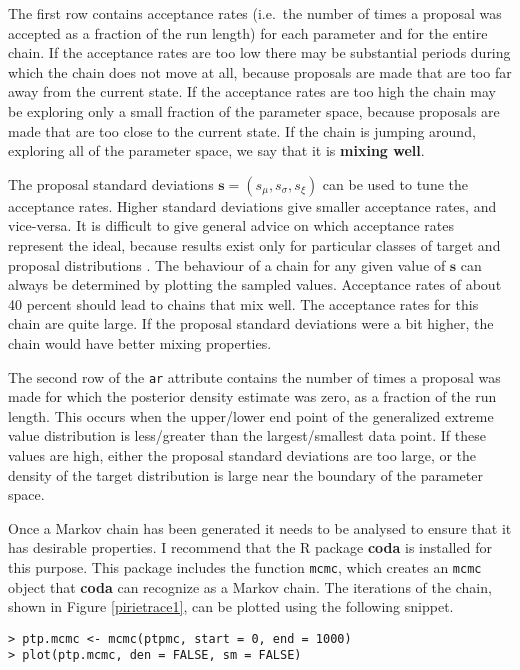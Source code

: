 \documentclass[11pt,a4paper]{article}
\newcommand{\bs}{\boldsymbol}
\begin{document}
The first row contains acceptance rates (i.e.\ the number of times a
proposal was accepted as a fraction of the run length) for each
parameter and for the entire chain.  If the acceptance rates are too
low there may be substantial periods during which the chain does not
move at all, because proposals are made that are too far away from the
current state.  If the acceptance rates are too high the chain may be
exploring only a small fraction of the parameter space, because
proposals are made that are too close to the current state.  If the
chain is jumping around, exploring all of the parameter space, we say
that it is \textbf{mixing well}.

The proposal standard deviations $\bs{s} = (s_\mu,s_\sigma,s_\xi)$ can
be used to tune the acceptance rates.  Higher standard deviations give
smaller acceptance rates, and vice-versa.  It is difficult to give
general advice on which acceptance rates represent the ideal, because
results exist only for particular classes of target and proposal
distributions \citep[e.g.][]{gelmcarl95}.  The behaviour of a chain
for any given value of $\bs{s}$ can always be determined by plotting
the sampled values.  Acceptance rates of about 40 percent should lead
to chains that mix well.  The acceptance rates for this chain are
quite large.  If the proposal standard deviations were a bit higher,
the chain would have better mixing properties.

The second row of the \verb+ar+ attribute contains the number of times
a proposal was made for which the posterior density estimate was zero,
as a fraction of the run length.  This occurs when the upper/lower end
point of the generalized extreme value distribution is less/greater
than the largest/smallest data point.  If these values are high,
either the proposal standard deviations are too large, or the density
of the target distribution is large near the boundary of the parameter
space.

Once a Markov chain has been generated it needs to be analysed to
ensure that it has desirable properties.  I recommend that the R
package \textbf{coda} is installed for this purpose.  This package
includes the function \verb+mcmc+, which creates an \verb+mcmc+ object
that \textbf{coda} can recognize as a Markov chain.  The iterations of
the chain, shown in Figure \ref{pirietrace1}, can be plotted using the
following snippet.

\begin{verbatim}
> ptp.mcmc <- mcmc(ptpmc, start = 0, end = 1000)
> plot(ptp.mcmc, den = FALSE, sm = FALSE)
\end{verbatim}
\end{document}

